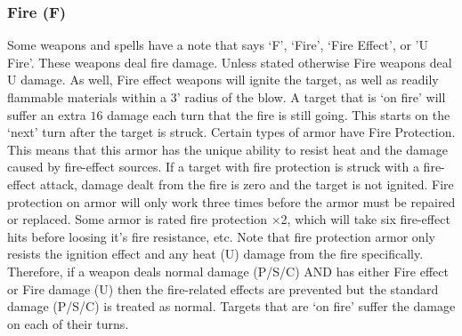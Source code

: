 \documentclass[twoside]{book}
\begin{document}
\subsubsection{Fire (F)}
     Some weapons and spells have a note that says
                 `F', `Fire', `Fire
                 Effect', or 'U Fire'. These weapons
                 deal fire damage. Unless stated otherwise Fire weapons
                 deal U damage. As well, Fire effect weapons will ignite
                 the target, as well as readily flammable materials
                 within a 3' radius of the blow. A target that is
                 `on fire' will suffer an extra \ensuremath{1}\ensuremath{6}\ensuremath{} damage
                 each turn that the fire is still going. This starts on
                 the `next' turn after the target is struck.
                 Certain types of armor have Fire Protection. This means
                 that this armor has the unique ability to resist heat
                 and the damage caused by fire-effect sources. If a
                 target with fire protection is struck with a fire-effect
                 attack, damage dealt from the fire is zero and the
                 target is not ignited. Fire protection on armor will
                 only work three times before the armor must be repaired
                 or replaced. Some armor is rated fire protection
                 \begin{math}\times \end{math}2, which will take six
                 fire-effect hits before loosing it's fire
                 resistance, etc. Note that fire protection armor only
                 resists the ignition effect and any heat (U) damage
                 from the fire specifically.  Therefore, if a weapon
                 deals normal damage (P/S/C) AND has either Fire
                 effect or Fire damage (U) then the fire-related
                 effects are prevented but the standard damage (P/S/C)
                 is treated as normal. Targets that are `on
                 fire' suffer the damage on each of their
                 turns. 
  

  
\end{document}
